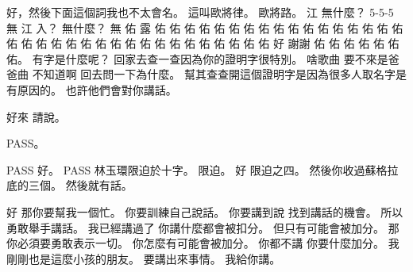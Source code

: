 \hypertarget{c01:cue:2621}{}好，然後下面這個詞我也不太會名。
\hypertarget{c01:cue:2622}{}這叫歐將律。
\hypertarget{c01:cue:2623}{}歐將路。
\hypertarget{c01:cue:2624}{}江 無什麼？ 5-5-5 無 江 入？ 無什麼？ 無 佑 露 佑 佑 佑 佑 佑 佑 佑 佑 佑 佑 佑 佑 佑 佑 佑 佑 佑 佑 佑 佑 佑 佑 佑 佑 佑 佑 佑 佑 佑 佑 佑 佑 佑 佑 佑 好 謝謝 佑 佑 佑 佑 佑 佑 佑。
\hypertarget{c01:cue:2625}{}有字是什麼呢？ 回家去查一查因為你的證明字很特別。
\hypertarget{c01:cue:2626}{}啥歌曲 要不來是爸爸曲 不知道啊 回去問一下為什麼。
\hypertarget{c01:cue:2627}{}幫其查查開這個證明字是因為很多人取名字是有原因的。
\hypertarget{c01:cue:2628}{}也許他們會對你講話。

\hypertarget{c01:cue:2629}{}好來 請說。

\hypertarget{c01:cue:2630}{}PASS。

\hypertarget{c01:cue:2631}{}PASS 好。
\hypertarget{c01:cue:2632}{}PASS 林玉環限迫於十字。
\hypertarget{c01:cue:2633}{}限迫。
\hypertarget{c01:cue:2634}{}好 限迫之四。
\hypertarget{c01:cue:2635}{}然後你收過蘇格拉底的三個。
\hypertarget{c01:cue:2636}{}然後就有話。

\hypertarget{c01:cue:2637}{}好 那你要幫我一個忙。
\hypertarget{c01:cue:2638}{}你要訓練自己說話。
\hypertarget{c01:cue:2639}{}你要講到說 找到講話的機會。
\hypertarget{c01:cue:2640}{}所以勇敢舉手講話。
\hypertarget{c01:cue:2641}{}我已經講過了 你講什麼都會被扣分。
\hypertarget{c01:cue:2642}{}但只有可能會被加分。
\hypertarget{c01:cue:2643}{}那你必須要勇敢表示一切。
\hypertarget{c01:cue:2644}{}你怎麼有可能會被加分。
\hypertarget{c01:cue:2645}{}你都不講 你要什麼加分。
\hypertarget{c01:cue:2646}{}我剛剛也是這麼小孩的朋友。
\hypertarget{c01:cue:2647}{}要講出來事情。
\hypertarget{c01:cue:2648}{}我給你講。

